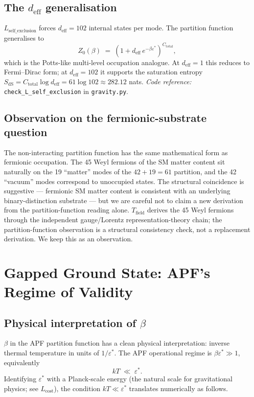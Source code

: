 \documentclass[11pt]{article}
\newcommand{\coderef}[2]{\smallskip\noindent\textit{Code reference:} \texttt{#1} in \texttt{#2}.}
\theoremstyle{definition}
\begin{document}
\subsection{The $d_{\mathrm{eff}}$ generalisation}
$L_{\mathrm{self\_exclusion}}$ forces $d_{\mathrm{eff}} = 102$ internal states per mode.  The partition function generalises to
\[
Z_0(\beta) \;=\; \left(1 + d_{\mathrm{eff}} \, e^{-\beta \varepsilon^*}\right)^{C_{\mathrm{total}}},
\]
which is the Potts-like multi-level occupation analogue.  At $d_{\mathrm{eff}} = 1$ this reduces to Fermi--Dirac form; at $d_{\mathrm{eff}} = 102$ it supports the saturation entropy $S_{\mathrm{dS}} = C_{\mathrm{total}} \log d_{\mathrm{eff}} = 61 \log 102 \approx 282.12$ nats.
\coderef{check\_L\_self\_exclusion}{gravity.py}

\subsection{Observation on the fermionic-substrate question}
The non-interacting partition function has the same mathematical form as fermionic occupation.  The 45 Weyl fermions of the SM matter content sit naturally on the 19 ``matter'' modes of the $42 + 19 = 61$ partition, and the 42 ``vacuum'' modes correspond to unoccupied states.  The structural coincidence is suggestive --- fermionic SM matter content is consistent with an underlying binary-distinction substrate --- but we are careful not to claim a new derivation from the partition-function reading alone.  $T_{\mathrm{field}}$ derives the 45 Weyl fermions through the independent gauge/Lorentz representation-theory chain; the partition-function observation is a structural consistency check, not a replacement derivation.  We keep this as an observation.

\section{Gapped Ground State: APF's Regime of Validity}\label{sec:validity}

\subsection{Physical interpretation of $\beta$}
$\beta$ in the APF partition function has a clean physical interpretation: inverse thermal temperature in units of $1/\varepsilon^*$.  The APF operational regime is $\beta \varepsilon^* \gg 1$, equivalently
\[
kT \;\ll\; \varepsilon^*.
\]
Identifying $\varepsilon^*$ with a Planck-scale energy (the natural scale for gravitational physics; see $L_{\mathrm{cost}}$), the condition $kT \ll \varepsilon^*$ translates numerically as follows.
\end{document}
